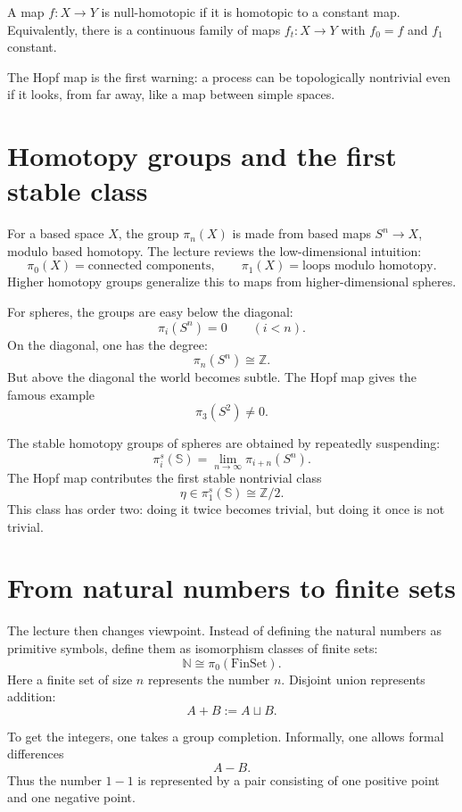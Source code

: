\begin{definition}
A map \(f:X\to Y\) is null-homotopic if it is homotopic to a constant map.  Equivalently, there is a continuous family of maps \(f_t:X\to Y\) with \(f_0=f\) and \(f_1\) constant.
\end{definition}

The Hopf map is the first warning: a process can be topologically nontrivial even if it looks, from far away, like a map between simple spaces.

\section{Homotopy groups and the first stable class}

For a based space \(X\), the group \(\pi_n(X)\) is made from based maps \(S^n\to X\), modulo based homotopy.  The lecture reviews the low-dimensional intuition:
\[
  \pi_0(X)=\text{connected components},
  \qquad
  \pi_1(X)=\text{loops modulo homotopy}.
\]
Higher homotopy groups generalize this to maps from higher-dimensional spheres.

For spheres, the groups are easy below the diagonal:
\[
  \pi_i(S^n)=0
  \qquad (i<n).
\]
On the diagonal, one has the degree:
\[
  \pi_n(S^n)\cong\mathbb Z.
\]
But above the diagonal the world becomes subtle.  The Hopf map gives the famous example
\[
  \pi_3(S^2)\neq0.
\]

The stable homotopy groups of spheres are obtained by repeatedly suspending:
\[
  \pi_i^s(\mathbb S)
  =
  \lim_{n\to\infty}\pi_{i+n}(S^n).
\]
The Hopf map contributes the first stable nontrivial class
\[
  \eta\in \pi_1^s(\mathbb S)\cong\mathbb Z/2.
\]
This class has order two: doing it twice becomes trivial, but doing it once is not trivial.

\section{From natural numbers to finite sets}

The lecture then changes viewpoint.  Instead of defining the natural numbers as primitive symbols, define them as isomorphism classes of finite sets:
\[
  \mathbb N
  \cong
  \pi_0(\mathrm{FinSet}).
\]
Here a finite set of size \(n\) represents the number \(n\).  Disjoint union represents addition:
\[
  A+B := A\sqcup B.
\]

To get the integers, one takes a group completion.  Informally, one allows formal differences
\[
  A-B.
\]
Thus the number \(1-1\) is represented by a pair consisting of one positive point and one negative point.

